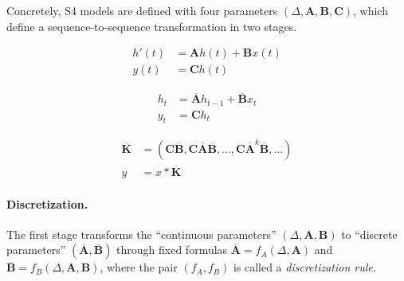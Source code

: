 Concretely, S4 models are defined with four parameters $(\Delta, \bm{A}, \bm{B}, \bm{C})$, which define a sequence-to-sequence transformation in two stages.

\begin{minipage}[t]{.30\linewidth}
  \begin{subequations}
    \label{eq:ssm}
    \begin{align}
      h'(t) &= \bm{A} h(t) + \bm{B} x(t) \\
      y(t) &= \bm{C} h(t)
    \end{align}
  \end{subequations}
\end{minipage}

\begin{minipage}[t]{.30\linewidth}
  \begin{subequations}
    \label{eq:ssm:recurrence}
    \begin{align}
    \label{eq:ssm:recurrence:1}
      h_{t} &= \overline{\bm{A}} h_{t-1} + \overline{\bm{B}} x_t \\
    \label{eq:ssm:recurrence:2}
      y_t &= \bm{C} h_t
    \end{align}
  \end{subequations}
\end{minipage}

\begin{minipage}[t]{.39\linewidth}
  \begin{subequations}
    \label{eq:ssm:convolution}
    \begin{align}
      \label{eq:ssm:convolution:1}
      \bm{\overline{K}} &= (\bm{C}\bm{\overline{B}}, \bm{C}\bm{\overline{A}}\bm{\overline{B}}, \dots, \bm{C}\bm{\overline{A}}^{k}\bm{\overline{B}}, \dots) \\
      \label{eq:ssm:convolution:2}
      y &= x \ast \bm{\overline{K}}
    \end{align}
  \end{subequations}
\end{minipage}

\paragraph{Discretization.}
The first stage transforms the ``continuous parameters'' $(\Delta, \bm{A}, \bm{B})$ to ``discrete parameters'' $(\overline{\bm{A}}, \overline{\bm{B}})$ through fixed formulas $\overline{\bm{A}} = f_A(\Delta, \bm{A})$ and $\overline{\bm{B}} = f_B(\Delta, \bm{A}, \bm{B})$,
where the pair $(f_A, f_B)$ is called a \emph{discretization rule}.

